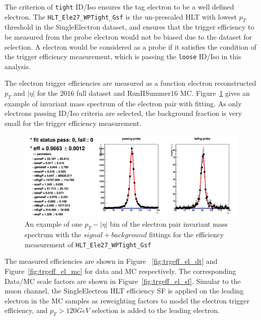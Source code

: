 The criterion of \texttt{tight} ID/Iso ensures the tag electron to be a well defined electron. The \texttt{HLT\_Ele27\_WPTight\_Gsf} is the un-prescaled HLT with lowest $p_T$ threshold in the SingleElectron dataset, and ensures that the trigger efficiency to be measured from the probe electron would not be biased due to the dataset for selection. A electron would be considered as a probe if it satisfies the condition of the trigger efficiency measurement, which is passing the \texttt{loose} ID/Iso in this analysis.

\vspace{0.3cm}
The electron trigger efficiencies are measured as a function electron reconstructed $p_T$ and $|\eta|$ for the 2016 full dataset and RunIISummer16 MC. Figure~\ref{fig:bg_etrgtnp} gives an example of invariant mass spectrum of the electron pair with fitting. As only electrons passing ID/Iso criteria are selected, the background fraction is very small for the trigger efficiency measurement.

\begin{figure}[htpb]
\begin{center}
\includegraphics[width=0.7\linewidth, page=1]{figures/bg_etrgtnp.png}
\caption{An example of one  $p_T - |\eta|$ bin of the electron pair invariant mass spectrum with the $signal+background$ fittings for the efficiency measurement of \texttt{HLT\_Ele27\_WPTight\_Gsf}}
\label{fig:bg_etrgtnp}
\end{center}
\end{figure}

\vspace{0.3cm}
The measured efficiencies are shown in Figure ~\ref{fig:trgeff_el_dt} and Figure~\ref{fig:trgeff_el_mc} for data and MC respectively. The corresponding Data/MC scale factors are shown in Figure~\ref{fig:trgeff_el_sf}. Simular to the muon channel, the SingleElectron HLT efficiency SF is applied on the leading electron in the MC samples as reweighting factors to model the electron trigger efficiency, and $p_T > 120GeV$ selection is added to the leading electron.

